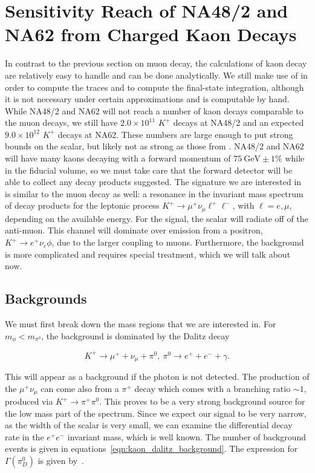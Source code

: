 \section{Sensitivity Reach of NA48/2 and NA62 from Charged Kaon Decays}
In contrast to the previous section on muon decay, the calculations of kaon decay are relatively easy to handle and can be done analytically.
We still make use of \feyncalc in order to compute the traces and \mathematica to compute the final-state integration, although it is not necessary under certain approximations and is computable by hand.
While NA48/2 and NA62 will not reach a number of kaon decays comparable to the muon decays, we still have $2.0 \times 10^{11}$ $K^+$ decays at NA48/2 and an expected $9.0 \times 10^{12}$ $K^+$ decays at NA62.
These numbers are large enough to put strong bounds on the scalar, but likely not as strong as those from \mueee.
NA48/2 and NA62 will have many kaons decaying with a forward momentum of $75~\textrm{GeV} \pm 1\%$ while in the fiducial volume, so we must take care that the forward detector will be able to collect any decay products suggested.
The signature we are interested in is similar to the muon decay as well: a resonance in the invariant mass spectrum of decay products for the leptonic process $K^+ \rightarrow \mu^+ \nu_\mu \ell^+ \ell^-$, with $\ell = e, \mu$, depending on the available energy.
For the signal, the scalar will radiate off of the anti-muon.
This channel will dominate over emission from a positron, $K^+ \rightarrow e^+ \nu_e \phi$, due to the larger coupling to muons.
Furthermore, the background is more complicated and requires special treatment, which we will talk about now.

\subsection{Backgrounds}
We must first break down the mass regions that we are interested in.
For $m_\phi < m_{\pi^0}$, the background is dominated by the Dalitz decay

\begin{equation}
    K^+ \rightarrow \mu^+ + \nu_\mu + \pi^0,~\pi^0 \rightarrow e^+ + e^- + \gamma\textrm{.}
\end{equation}

\noindent This will appear as a background if the photon is not detected.
The production of the $\mu^+ \nu_\mu$ can come also from a $\pi^+$ decay which comes with a branching ratio $\sim 1$, produced via $K^+ \rightarrow \pi^+ \pi^0$.
This proves to be a very strong background source for the low mass part of the spectrum.
Since we expect our signal to be very narrow, as the width of the scalar is very small, we can examine the differential decay rate in the $e^+ e^-$ invariant mass, which is well known.
The number of background events is given in equations~\ref{eqn:kaon_dalitz_background}.
The expression for $\Gamma(\pi^0_D)$ is given by~\cite{Mikaelian:1972yg}.

